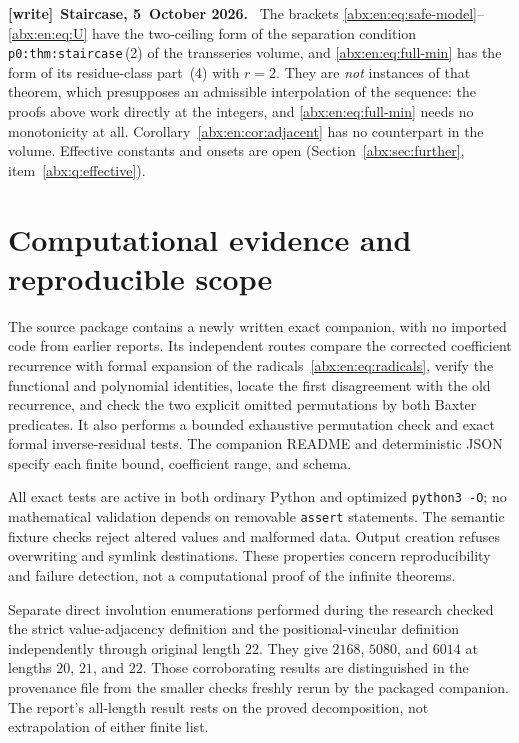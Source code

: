 \documentclass[11pt,letterpaper]{article}
\numberwithin{equation}{section}
\theoremstyle{remark}\newtheorem{remark}[theorem]{Remark}
\newenvironment{writenote}[1][]{\par\smallskip\begingroup\small
 \noindent\textbf{[write]}\if\relax\detokenize{#1}\relax\else~\textbf{#1.}\fi\ }%
 {\par\endgroup\smallskip}
\begin{document}
\begin{writenote}[Staircase, 5~October 2026]
The brackets \eqref{abx:en:eq:safe-model}--\eqref{abx:en:eq:U} have the two-ceiling form of the separation condition \texttt{p0:thm:staircase}\,(2) of the transseries volume, and \eqref{abx:en:eq:full-min} has the form of its residue-class part~(4) with $r=2$. They are \emph{not} instances of that theorem, which presupposes an admissible interpolation of the sequence: the proofs above work directly at the integers, and \eqref{abx:en:eq:full-min} needs no monotonicity at all. Corollary~\ref{abx:en:cor:adjacent} has no counterpart in the volume. Effective constants and onsets are open (Section~\ref{abx:sec:further}, item~\ref{abx:q:effective}).
\end{writenote}

\section{Computational evidence and reproducible scope}\label{abx:en:sec:evidence}
The source package contains a newly written exact companion, with
no imported code from earlier reports. Its independent routes compare
the corrected coefficient recurrence with formal expansion of the
radicals~\eqref{abx:en:eq:radicals}, verify the functional and polynomial
identities, locate the first disagreement with the old recurrence, and
check the two explicit omitted permutations by both Baxter predicates.
It also performs a bounded exhaustive permutation check and exact
formal inverse-residual tests. The companion README and deterministic
JSON specify each finite bound, coefficient range, and schema.

All exact tests are active in both ordinary Python and optimized
\texttt{python3 -O}; no mathematical validation depends on removable
\texttt{assert} statements. The semantic fixture checks reject altered
values and malformed data. Output creation refuses overwriting and
symlink destinations. These properties concern reproducibility and
failure detection, not a computational proof of the infinite theorems.

Separate direct involution enumerations performed during the research
checked the strict value-adjacency definition and the positional-vincular
definition independently through original length $22$. They give
$2168$, $5080$, and $6014$ at lengths $20$, $21$, and $22$.
Those corroborating results are distinguished in the provenance file
from the smaller checks freshly rerun by the packaged companion.
The report's all-length result rests on the proved decomposition, not
extrapolation of either finite list.
\end{document}
